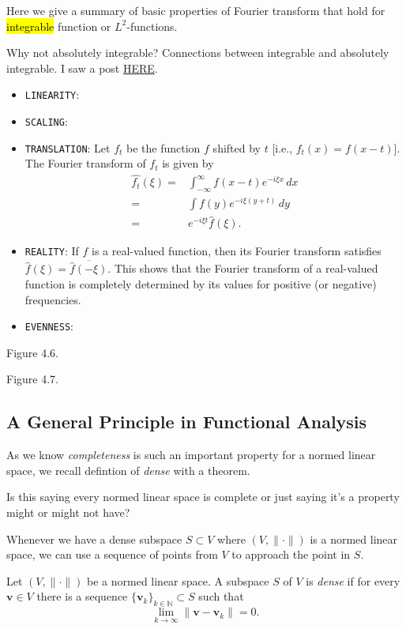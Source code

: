 Here we give a summary of basic properties of Fourier transform that hold for \hl{integrable} function or $L^2$-functions. 

\begin{Question}
    Why not absolutely integrable? Connections between integrable and absolutely integrable. I saw a post \href{https://math.stackexchange.com/questions/2255939/does-absolute-integrability-imply-integrability}{HERE}.
\end{Question}

\begin{itemize}
    \item \texttt{LINEARITY}:
    \item \texttt{SCALING}:
    \item \texttt{TRANSLATION}: Let $f_t$ be the function $f$ shifted by $t$ [i.e., $f_t(x)=f(x-t)$]. The Fourier transform of $f_t$ is given by \begin{align*}
        \hat{f_t}(\xi) =& \int_{-\infty}^{\infty} f(x-t)e^{-i\xi x}\,dx\\
        =& \int f(y)e^{-i\xi(y+t)}\,dy\\
        =& e^{-i\xi t} \hat{f}(\xi).
    \end{align*}
    \item \texttt{REALITY}: If $f$ is a real-valued function, then its Fourier transform satisfies \(\hat{f}(\xi)=\overline{\hat{f}(-\xi)}\). This shows that the Fourier transform of a real-valued function is completely determined by its values for positive (or negative) frequencies. 
    \item \texttt{EVENNESS}:
\end{itemize}

Figure 4.6.

Figure 4.7.

\subsection{A General Principle in Functional Analysis}

As we know \textit{completeness} is such an important property for a normed linear space, we recall defintion of \textit{dense} with a theorem. \begin{Question}
    Is this saying every normed linear space is complete or just saying it's a property might or might not have?
\end{Question}

Whenever we have a dense subspace $S\subset V$ where $(V,\lVert \cdot\rVert)$ is a normed linear space, we can use a sequence of points from $V$ to approach the point in $S$.
\begin{Definition}[Defintion 4.2.7.]
Let $(V,\lVert \cdot\rVert)$ be a normed linear space. A subspace $S$ of $V$ is \textit{dense} if for every $\mathbf v\in V$ there is a sequence $\{\mathbf v_k\}_{k\in\mathbb N}\subset S$ such that 
\[\lim_{k\to\infty}\lVert \mathbf v-\mathbf v_k\rVert =0.\]
\end{Definition}


